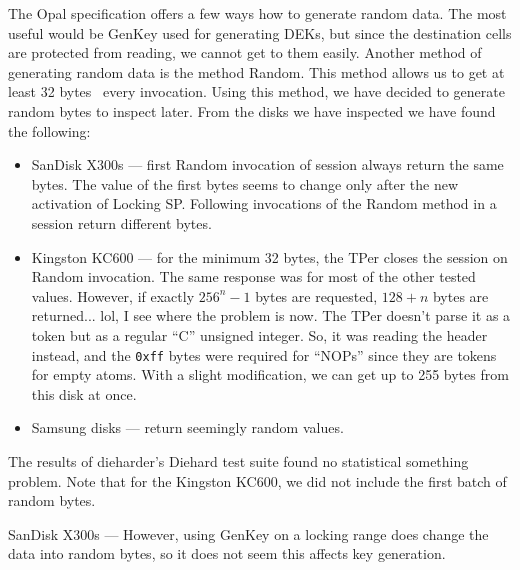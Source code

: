 The Opal specification offers a few ways how to generate random data. The most useful would be GenKey used for generating DEKs, but since the destination cells are protected from reading, we cannot get to them easily. Another method of generating random data is the method Random. This method allows us to get at least 32 bytes~\cite{tcg-opal2} every invocation. Using this method, we have decided to generate random bytes to inspect later.
From the disks we have inspected we have found the following:
\begin{itemize}
    \item SanDisk X300s --- first Random invocation of session always return the same bytes. The value of the first bytes seems to change only after the new activation of Locking SP. Following invocations of the Random method in a session return different bytes.
    \item Kingston KC600 --- for the minimum 32 bytes, the TPer closes the session on Random invocation. The same response was for most of the other tested values. However, if exactly $256^n-1$ bytes are requested, $128+n$ bytes are returned... lol, I see where the problem is now. The TPer doesn't parse it as a token but as a regular ``C'' unsigned integer. So, it was reading the header instead, and the \verb|0xff| bytes were required for ``NOPs'' since they are tokens for empty atoms. With a slight modification, we can get up to 255 bytes from this disk at once.
    \item Samsung disks --- return seemingly random values.
\end{itemize}
The results of dieharder's Diehard test suite found no statistical something problem. Note that for the Kingston KC600, we did not include the first batch of random bytes.

SanDisk X300s --- However, using GenKey on a locking range does change the data into random bytes, so it does not seem this affects key generation.

